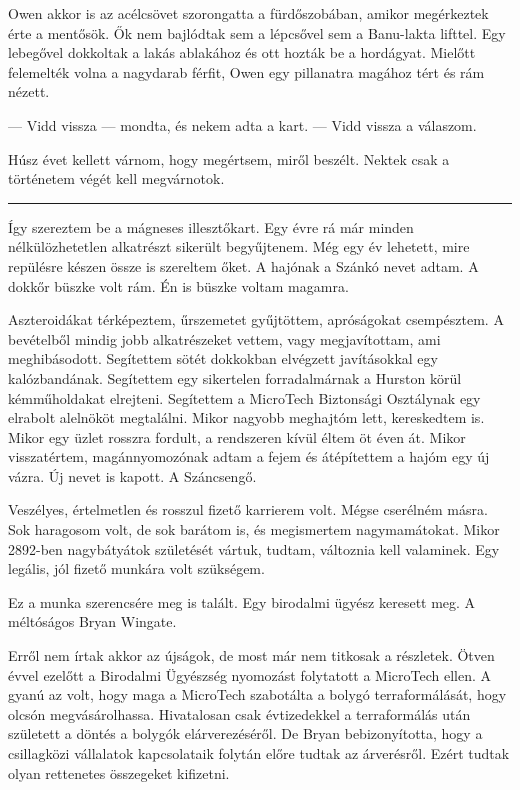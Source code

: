 \documentclass[10pt]{memoir}
\renewcommand{\pfbreakdisplay}{\bigskip \ding{70} \bigskip}
\newcommand{\secbreak}{\fancybreak{\pfbreakdisplay}}
\begin{document}
Owen akkor is az acélcsövet szorongatta a fürdőszobában, amikor megérkeztek
érte a mentősök. Ők nem bajlódtak sem a lépcsővel sem a Banu-lakta lifttel. Egy
lebegővel dokkoltak a lakás ablakához és ott hozták be a hordágyat. Mielőtt
felemelték volna a nagydarab férfit, Owen egy pillanatra magához tért és rám
nézett.

— Vidd vissza — mondta, és nekem adta a kart. — Vidd vissza a válaszom.

Húsz évet kellett várnom, hogy megértsem, miről beszélt. Nektek csak a
történetem végét kell megvárnotok.

\secbreak

Így szereztem be a mágneses illesztőkart. Egy évre rá már minden
nélkülözhetetlen alkatrészt sikerült begyűjtenem. Még egy év lehetett, mire
repülésre készen össze is szereltem őket. A hajónak a Szánkó nevet adtam. A
dokkőr büszke volt rám. Én is büszke voltam magamra.

Aszteroidákat térképeztem, űrszemetet gyűjtöttem, apróságokat csempésztem. A
bevételből mindig jobb alkatrészeket vettem, vagy megjavítottam, ami
meghibásodott. Segítettem sötét dokkokban elvégzett javításokkal egy
kalózbandának. Segítettem egy sikertelen forradalmárnak a Hurston körül
kémműholdakat elrejteni. Segítettem a MicroTech Biztonsági Osztálynak egy
elrabolt alelnököt megtalálni. Mikor nagyobb meghajtóm lett, kereskedtem is.
Mikor egy üzlet rosszra fordult, a rendszeren kívül éltem öt éven át. Mikor
visszatértem, magánnyomozónak adtam a fejem és átépítettem a hajóm egy új
vázra. Új nevet is kapott. A Száncsengő.

Veszélyes, értelmetlen és rosszul fizető karrierem volt. Mégse cserélném másra.
Sok haragosom volt, de sok barátom is, és megismertem nagymamátokat. Mikor
2892-ben nagybátyátok születését vártuk, tudtam, változnia kell valaminek. Egy
legális, jól fizető munkára volt szükségem.

Ez a munka szerencsére meg is talált. Egy birodalmi ügyész keresett meg. A
méltóságos Bryan Wingate.

Erről nem írtak akkor az újságok, de most már nem titkosak a részletek. Ötven
évvel ezelőtt a Birodalmi Ügyészség nyomozást folytatott a MicroTech ellen. A
gyanú az volt, hogy maga a MicroTech szabotálta a bolygó terraformálását, hogy
olcsón megvásárolhassa. Hivatalosan csak évtizedekkel a terraformálás után
született a döntés a bolygók elárverezéséről. De Bryan bebizonyította, hogy a
csillagközi vállalatok kapcsolataik folytán előre tudtak az árverésről. Ezért
tudtak olyan rettenetes összegeket kifizetni.
\end{document}
